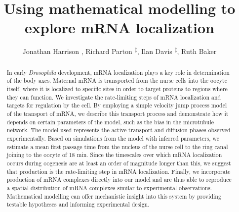 \documentclass[twocolumn]{biophys}
\begin{document}
\setcounter{page}{1} %

\title{Using mathematical modelling to explore mRNA localization}

\author{Jonathan Harrison \authdagger, Richard Parton \textsuperscript{$\ddagger$}, Ilan Davis \textsuperscript{$\ddagger$}, Ruth Baker \authdagger}

\address{\addrdagger Mathematical Institute, University of Oxford; \textsuperscript{$\ddagger$} Department of Biochemistry, University of Oxford}





\begin{abstract}%
{In early \textit{Drosophila} development, mRNA localization plays a key role in determination of the body axes. 
Maternal mRNA is transported from the nurse cells into the oocyte itself, where it is localized to specific sites in order to target proteins to regions where they can function. 
We investigate the rate-limiting steps of mRNA localization and targets for regulation by the cell.
By employing a simple velocity jump process model of the transport of mRNA, we describe this transport process and demonstrate how it depends on certain parameters of the model, such as the bias in the microtubule network.
The model used represents the active transport and diffusion phases observed experimentally.
Based on simulations from the model with inferred parameters, we estimate a mean first passage time from the nucleus of the nurse cell to the ring canal joining to the oocyte of 18 min. 
Since the timescales over which mRNA localization occurs during oogenesis are at least an order of magnitude longer than this, we suggest that production is the rate-limiting step in mRNA localization. 
Finally, we incorporate production of mRNA complexes directly into our model and are thus able to reproduce a spatial distribution of mRNA complexes similar to experimental observations.
Mathematical modelling can offer mechanistic insight into this system by providing testable hypotheses and informing experimental design.
}%
{}
{}
\end{abstract}

\maketitle %
\end{document}
